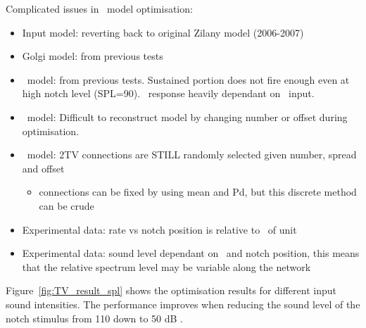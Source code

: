 Complicated issues in \TV~model optimisation:
\begin{itemize}
\item Input model: reverting back to original Zilany model (2006-2007)
\item Golgi model: from previous tests
\item \DS~model: from previous tests.  Sustained portion does not fire enough even at high notch level (SPL=90).  \TV~response heavily dependant on  \DS~input.
\item \TV~model: Difficult to reconstruct model by changing number or offset during optimisation.
\item \TV~model: \DS2TV connections are STILL randomly selected given number, spread and offset
  \begin{itemize}
  \item connections can be fixed by using mean and Pd, but this discrete method can be crude
  \end{itemize}
\item Experimental data: rate vs notch position is relative to \BF~of unit
\item Experimental data: sound level dependant on \BF~and notch position, this means that the relative spectrum level may be variable along the network
\end{itemize}



Figure~\ref{fig:TV_result_spl} shows the optimisation results for different input sound intensities.
The performance improves when reducing the sound level of the notch stimulus from 110 down to 50 dB \SPL.

